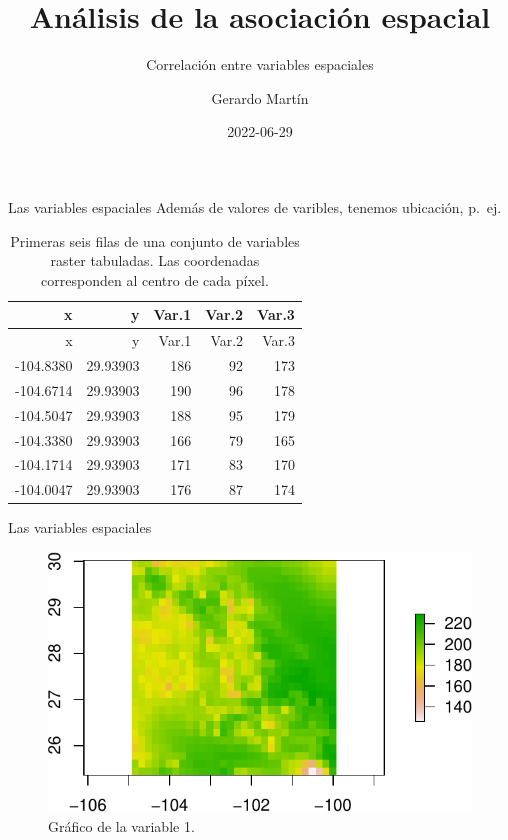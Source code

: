 \documentclass[
  11pt,
  ignorenonframetext,
]{beamer}
\title{Análisis de la asociación espacial}
\subtitle{Correlación entre variables espaciales}
\author{Gerardo Martín}
\date{2022-06-29}
\begin{document}
\frame{\titlepage}

\begin{frame}{Las variables espaciales}
\protect\hypertarget{las-variables-espaciales}{}
Además de valores de varibles, tenemos ubicación, p.~ej.

\begin{longtable}[]{@{}rrrrr@{}}
\caption{Primeras seis filas de una conjunto de variables raster
tabuladas. Las coordenadas corresponden al centro de cada
píxel.}\tabularnewline
\toprule()
x & y & Var.1 & Var.2 & Var.3 \\
\midrule()
\endfirsthead
\toprule()
x & y & Var.1 & Var.2 & Var.3 \\
\midrule()
\endhead
-104.8380 & 29.93903 & 186 & 92 & 173 \\
-104.6714 & 29.93903 & 190 & 96 & 178 \\
-104.5047 & 29.93903 & 188 & 95 & 179 \\
-104.3380 & 29.93903 & 166 & 79 & 165 \\
-104.1714 & 29.93903 & 171 & 83 & 170 \\
-104.0047 & 29.93903 & 176 & 87 & 174 \\
\bottomrule()
\end{longtable}
\end{frame}

\begin{frame}{Las variables espaciales}
\protect\hypertarget{las-variables-espaciales-1}{}
\begin{figure}

{\centering \includegraphics{Correlacion-espacial_files/figure-beamer/unnamed-chunk-2-1} 

}

\caption{Gráfico de la variable 1.}\label{fig:unnamed-chunk-2}
\end{figure}
\end{frame}
\end{document}
